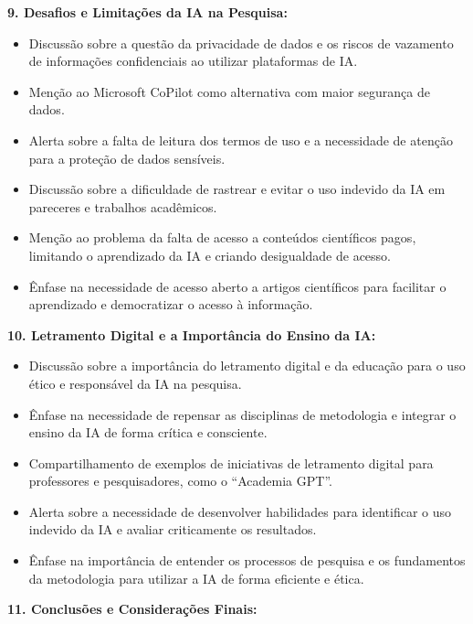 \documentclass[
  a4paper,
]{article}
\providecommand{\tightlist}{%
  \setlength{\itemsep}{0pt}\setlength{\parskip}{0pt}}\usepackage{longtable,booktabs,array}
\begin{document}
\begin{tcolorbox}
\textbf{9. Desafios e Limitações da IA na Pesquisa:}

\begin{itemize}
\tightlist
\item
  Discussão sobre a questão da privacidade de dados e os riscos de
  vazamento de informações confidenciais ao utilizar plataformas de IA.
\item
  Menção ao Microsoft CoPilot como alternativa com maior segurança de
  dados.
\item
  Alerta sobre a falta de leitura dos termos de uso e a necessidade de
  atenção para a proteção de dados sensíveis.
\item
  Discussão sobre a dificuldade de rastrear e evitar o uso indevido da
  IA em pareceres e trabalhos acadêmicos.
\item
  Menção ao problema da falta de acesso a conteúdos científicos pagos,
  limitando o aprendizado da IA e criando desigualdade de acesso.
\item
  Ênfase na necessidade de acesso aberto a artigos científicos para
  facilitar o aprendizado e democratizar o acesso à informação.
\end{itemize}

\textbf{10. Letramento Digital e a Importância do Ensino da IA:}

\begin{itemize}
\tightlist
\item
  Discussão sobre a importância do letramento digital e da educação para
  o uso ético e responsável da IA na pesquisa.
\item
  Ênfase na necessidade de repensar as disciplinas de metodologia e
  integrar o ensino da IA de forma crítica e consciente.
\item
  Compartilhamento de exemplos de iniciativas de letramento digital para
  professores e pesquisadores, como o ``Academia GPT''.
\item
  Alerta sobre a necessidade de desenvolver habilidades para identificar
  o uso indevido da IA e avaliar criticamente os resultados.
\item
  Ênfase na importância de entender os processos de pesquisa e os
  fundamentos da metodologia para utilizar a IA de forma eficiente e
  ética.
\end{itemize}

\textbf{11. Conclusões e Considerações Finais:}


\end{tcolorbox}
\end{document}
